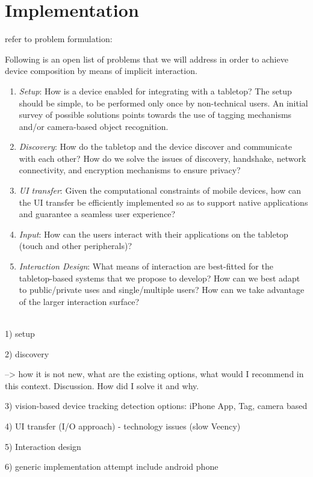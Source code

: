 

\chapter{Implementation}

refer to problem formulation:

Following is an open list of problems that we will address in order to achieve device composition by means of implicit interaction.
\begin{enumerate}
\item{\emph{Setup}: How is a device enabled for integrating with a tabletop?
The setup should be simple, to be performed only once by non-technical users.
An initial survey of possible solutions points towards the use of tagging mechanisms and/or camera-based object recognition.}
\item{\emph{Discovery}: How do the tabletop and the device discover and communicate with each other?
How do we solve the issues of discovery, handshake, network connectivity, and encryption mechanisms to ensure privacy?}
\item{\emph{UI transfer}: Given the computational constraints of mobile devices, how can the UI transfer be efficiently implemented so as to support native applications and guarantee a seamless user experience?}
\item{\emph{Input}: How can the users interact with their applications on the tabletop (touch and other peripherals)?}
\item{\emph{Interaction Design}: What means of interaction are best-fitted for the tabletop-based systems that we propose to develop?
How can we best adapt to public/private uses and single/multiple users?
How can we take advantage of the larger interaction surface?}
\end{enumerate}

\hfill\\

1) setup

2) discovery

--> how it is not new, what are the existing options, what would I recommend in this context. Discussion. How did I solve it and why.

3) vision-based device tracking
detection options: iPhone App, Tag, camera based 

4) UI transfer (I/O approach)
- technology issues (slow Veency)

5) Interaction design

6) generic implementation attempt 
include android phone